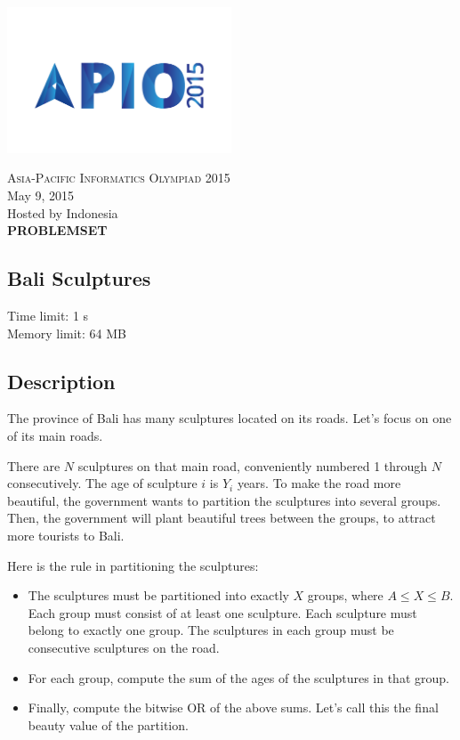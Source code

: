 \documentclass[a4paper]{article}
\begin{document}
\begin{titlepage}
\begin{center}
	\includegraphics[width=0.5\textwidth]{apio2015}
	
	\textsc{\huge Asia-Pacific Informatics Olympiad 2015}\\[0.5cm]
	
	\LARGE May 9, 2015\\[0.25cm]
    \LARGE Hosted by Indonesia\\[3cm]
    
    \LARGE \bfseries PROBLEMSET\\[0.5cm]
	
\end{center}
\end{titlepage}

\begin{center}
\section*{Bali Sculptures}
Time limit: 1 s\\
Memory limit: 64 MB
\end{center}

\subsection*{Description}

The province of Bali has many sculptures located on its roads. Let's focus on one of its main roads.

There are $N$ sculptures on that main road, conveniently numbered 1 through $N$ consecutively. The age of sculpture $i$ is $Y_{i}$ years. To make the road more beautiful, the government wants to partition the sculptures into several groups. Then, the government will plant beautiful trees between the groups, to attract more tourists to Bali.

Here is the rule in partitioning the sculptures:
\begin{itemize} \itemsep1pt \parskip0pt
\item The sculptures must be partitioned into exactly $X$ groups, where $A \le X \le B$. Each group must consist of at least one sculpture. Each sculpture must belong to exactly one group. The sculptures in each group must be consecutive sculptures on the road.
\item For each group, compute the sum of the ages of the sculptures in that group.
\item Finally, compute the bitwise OR of the above sums. Let's call this the final beauty value of the partition.
\end{itemize}
\end{document}
